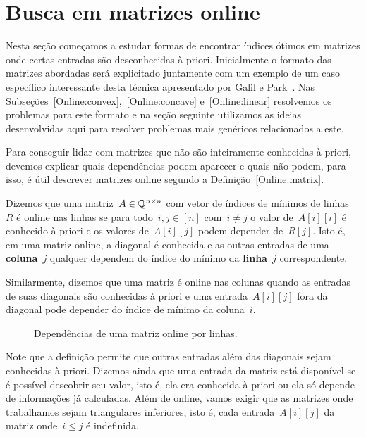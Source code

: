 \section{Busca em matrizes online}
\label{Online}

Nesta seção começamos a estudar formas de encontrar índices ótimos em matrizes onde certas entradas são desconhecidas à priori. Inicialmente o formato das matrizes abordadas será explicitado juntamente com um exemplo de um caso específico interessante desta técnica apresentado por Galil e Park~\cite{Galil:1992}. Nas Subseções~\ref{Online:convex},~\ref{Online:concave} e~\ref{Online:linear} resolvemos os problemas para este formato e na seção seguinte utilizamos as ideias desenvolvidas aqui para resolver problemas mais genéricos relacionados a este.

Para conseguir lidar com matrizes que não são inteiramente conhecidas à priori, devemos explicar quais dependências podem aparecer e quais não podem, para isso, é útil descrever matrizes online segundo a Definição~\ref{Online:matrix}.

\begin{defi} \label{Online:matrix}
Dizemos que uma matriz~$A \in \mathbb{Q}^{n \times n}$ com vetor de índices de mínimos de linhas~$R$ é online nas linhas se para todo~$i,j \in [n]$ com~$i \neq j$ o valor de~$A[i][i]$ é conhecido à priori e os valores de~$A[i][j]$ podem depender de~$R[j]$. Isto é, em uma matriz online, a diagonal é conhecida e as outras entradas de uma \textbf{coluna}~$j$ qualquer dependem do índice do mínimo da \textbf{linha}~$j$ correspondente.

Similarmente, dizemos que uma matriz é online nas colunas quando as entradas de suas diagonais são conhecidas à priori e uma entrada~$A[i][j]$ fora da diagonal pode depender do índice de mínimo da coluna~$i$.
\end{defi}

\begin{figure}[b]
    \centering
    
    \caption{Dependências de uma matriz online por linhas.} \label{Online:matrix:fig}
\end{figure}

Note que a definição permite que outras entradas além das diagonais sejam conhecidas à priori. Dizemos ainda que uma entrada da matriz está disponível se é possível descobrir seu valor, isto é, ela era conhecida à priori ou ela só depende de informações já calculadas. Além de online, vamos exigir que as matrizes onde trabalhamos sejam triangulares inferiores, isto é, cada entrada~$A[i][j]$ da matriz onde~$i \leq j$ é indefinida.

